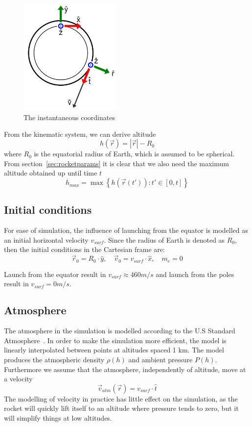 \documentclass[11pt]{article}
\begin{document}
\begin{figure}[H]
  \centering
  \includegraphics[width=0.45\textwidth]{./orbit.png}
  \caption{The instantaneous coordinates}
\end{figure}

From the kinematic system, we can derive altitude
$$
h(\vec{r}) = \left| \vec{r} \right| - R_0
$$
where $R_0$ is the equatorial radius of Earth, which is assumed to be spherical.
From section~\ref{sec:rocketparams} it is clear that we also need the maximum altitude obtained up until time $t$
$$
h_{max} = \max \left\{  h(\vec{r}(t')) : t' \in [0, t] \right\}
$$

\subsection{Initial conditions}
For ease of simulation, the influence of launching from the equator is modelled as an initial horizontal velocity $v_{surf}$.
Since the radius of Earth is denoted as $R_0$, then the initial conditions in the Cartesian frame are:
$$
\vec{r}_0 = R_0 \cdot \hat{y}, \quad \vec{v}_0 = v_{surf} \cdot \hat{x}, \quad m_e = 0
$$

Launch from the equator result in $v_{surf} \approx 460 m/s$ and launch from the poles result in $v_{surf} = 0 m/s$.

\subsection{Atmosphere} \label{sec:atmosphere}
The atmosphere in the simulation is modelled according to the U.S Standard Atmosphere~\cite{atmosphere2014}. 
In order to make the simulation more efficient, the model is linearly interpolated between points at altitudes spaced 1 km.
The model produces the atmospheric density $\rho(h)$ and ambient pressure $P(h)$.
Furthermore we assume that the atmosphere, independently of altitude, move at a velocity
$$
\vec{v}_{atm} (\vec{r}) = v_{surf} \cdot \hat{t}
$$
The modelling of velocity in practice has little effect on the simulation, as the rocket will quickly lift itself to an altitude where pressure tends to zero,
but it will simplify things at low altitudes.
\end{document}
